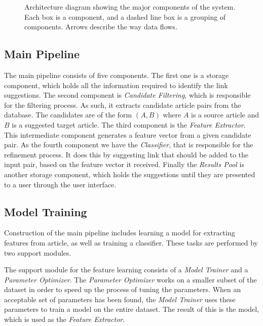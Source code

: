 
\begin{figure}[tb]%
  \centering
  
\caption[Architecture diagram showing the major components of the system]{Architecture diagram showing the major components of the system. Each box is a component, and a dashed line box is a grouping of components. Arrows describe the way data flows.}%
\label{fig:system-overview}%
\end{figure}

\subsection{Main Pipeline}
The main pipeline consists of five components. The first one is a storage component, which holds all the information required to identify the link suggestions. The second component is \emph{Candidate Filtering}, which is responsible for the filtering process. As such, it extracts candidate article pairs from the database. The candidates are of the form $(A,B)$ where $A$ is a source article and $B$ is a suggested target article. The third component is the \emph{Feature Extractor}. This intermediate component generates a feature vector from a given candidate pair. As the fourth component we have the \emph{Classifier}, that is responsible for the refinement process. It does this by suggesting link that should be added to the input pair, based on the feature vector it received. Finally the \emph{Results Pool} is another storage component, which holds the suggestions until they are presented to a user through the user interface.

\subsection{Model Training}
Construction of the main pipeline includes learning a model for extracting features from article, as well as training a classifier. These tasks are performed by two support modules.

The support module for the feature learning consists of a \emph{Model Trainer} and a \emph{Parameter Optimizer}. The \emph{Parameter Optimizer} works on a smaller subset of the dataset in order to speed up the process of tuning the parameters. When an acceptable set of parameters has been found, the \emph{Model Trainer} uses these parameters to train a model on the entire dataset. The result of this is the model, which is used as the \emph{Feature Extractor}.

